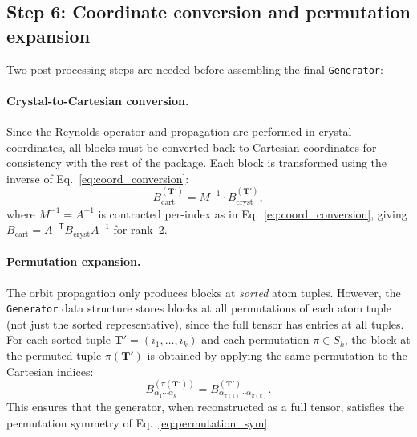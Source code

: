 \documentclass[twocolumn,amsmath,amssymb,aps,prb,10pt,floatfix]{revtex4-2}
\newcommand{\vT}{\mathbf{T}}
\begin{document}
\subsection{Step 6: Coordinate conversion and permutation expansion}

Two post-processing steps are needed before assembling the final \texttt{Generator}:

\paragraph{Crystal-to-Cartesian conversion.}
Since the Reynolds operator and propagation are performed in crystal coordinates, all blocks must be converted back to Cartesian coordinates for consistency with the rest of the package.
Each block is transformed using the inverse of Eq.~\eqref{eq:coord_conversion}:
\begin{equation}
B^{(\vT')}_{\mathrm{cart}} = M^{-1} \cdot B^{(\vT')}_{\mathrm{cryst}},
\label{eq:block_cryst_to_cart}
\end{equation}
where $M^{-1} = A^{-1}$ is contracted per-index as in Eq.~\eqref{eq:coord_conversion}, giving $B_{\mathrm{cart}} = A^{-\mathsf{T}} B_{\mathrm{cryst}} A^{-1}$ for rank~2.

\paragraph{Permutation expansion.}
The orbit propagation only produces blocks at \emph{sorted} atom tuples.
However, the \texttt{Generator} data structure stores blocks at all permutations of each atom tuple (not just the sorted representative), since the full tensor has entries at all tuples.
For each sorted tuple $\vT' = (i_1, \ldots, i_k)$ and each permutation $\pi \in S_k$, the block at the permuted tuple $\pi(\vT')$ is obtained by applying the same permutation to the Cartesian indices:
\begin{equation}
B^{(\pi(\vT'))}_{\alpha_1 \cdots \alpha_k}
= B^{(\vT')}_{\alpha_{\pi(1)} \cdots \alpha_{\pi(k)}}.
\label{eq:perm_expansion}
\end{equation}
This ensures that the generator, when reconstructed as a full tensor, satisfies the permutation symmetry of Eq.~\eqref{eq:permutation_sym}.
\end{document}
